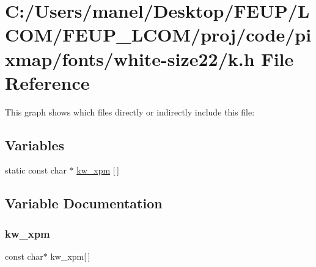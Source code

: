 \hypertarget{white-size22_2k_8h}{}\section{C\+:/\+Users/manel/\+Desktop/\+F\+E\+U\+P/\+L\+C\+O\+M/\+F\+E\+U\+P\+\_\+\+L\+C\+O\+M/proj/code/pixmap/fonts/white-\/size22/k.h File Reference}
\label{white-size22_2k_8h}
This graph shows which files directly or indirectly include this file\+:
\subsection*{Variables}
\begin{DoxyCompactItemize}
\item 
static const char $\ast$ \mbox{\hyperlink{white-size22_2k_8h_a9710888a232e9b73dddf489f31ab95b3}{kw\+\_\+xpm}} \mbox{[}$\,$\mbox{]}
\end{DoxyCompactItemize}


\subsection{Variable Documentation}
\mbox{\label{white-size22_2k_8h_a9710888a232e9b73dddf489f31ab95b3}} 
\subsubsection{\texorpdfstring{kw\_xpm}{kw\_xpm}}
{\footnotesize\ttfamily const char$\ast$ kw\+\_\+xpm\mbox{[}$\,$\mbox{]}\hspace{0.3cm}{\ttfamily [static]}}

